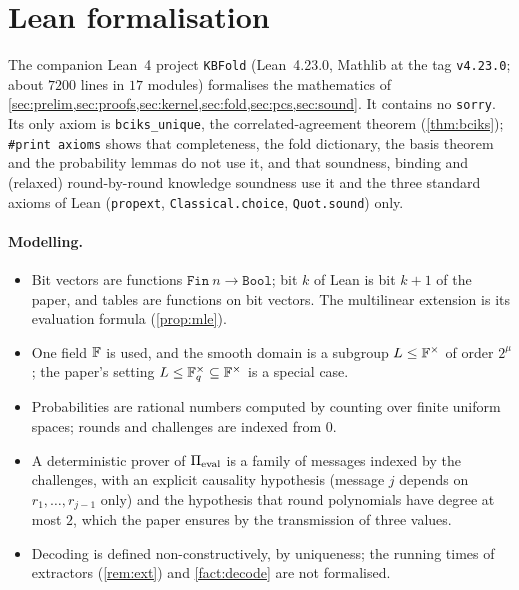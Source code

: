 \section{Lean formalisation}\label{sec:lean}

The companion Lean~4 project \texttt{KBFold} (Lean~4.23.0, Mathlib at the tag \texttt{v4.23.0}; about $7200$ lines in $17$ modules) formalises the mathematics of \cref{sec:prelim,sec:proofs,sec:kernel,sec:fold,sec:pcs,sec:sound}.
It contains no \texttt{sorry}. Its only axiom is \texttt{bciks\_unique}, the correlated-agreement theorem (\cref{thm:bciks}); \texttt{\#print axioms} shows that completeness, the fold dictionary, the basis theorem and the probability lemmas do not use it, and that soundness, binding and (relaxed) round-by-round knowledge soundness use it and the three standard axioms of Lean (\texttt{propext}, \texttt{Classical.choice}, \texttt{Quot.sound}) only.

\paragraph{Modelling.}
\begin{itemize}
  \item Bit vectors are functions $\mathtt{Fin}\ n \to \mathtt{Bool}$; bit $k$ of Lean is bit $k+1$ of the paper, and tables are functions on bit vectors. The multilinear extension is its evaluation formula (\cref{prop:mle}).
  \item One field $\mathbb{F}$ is used, and the smooth domain is a subgroup $L \le \mathbb{F}^\times$ of order $2^\mu$; the paper's setting $L \le \mathbb{F}_q^\times \subseteq \mathbb{F}^\times$ is a special case.
  \item Probabilities are rational numbers computed by counting over finite uniform spaces; rounds and challenges are indexed from $0$.
  \item A deterministic prover of $\Pi_{\mathrm{eval}}$ is a family of messages indexed by the challenges, with an explicit causality hypothesis (message $j$ depends on $r_1,\dots,r_{j-1}$ only) and the hypothesis that round polynomials have degree at most $2$, which the paper ensures by the transmission of three values.
  \item Decoding is defined non-constructively, by uniqueness; the running times of extractors (\cref{rem:ext}) and \cref{fact:decode} are not formalised.
\end{itemize}

